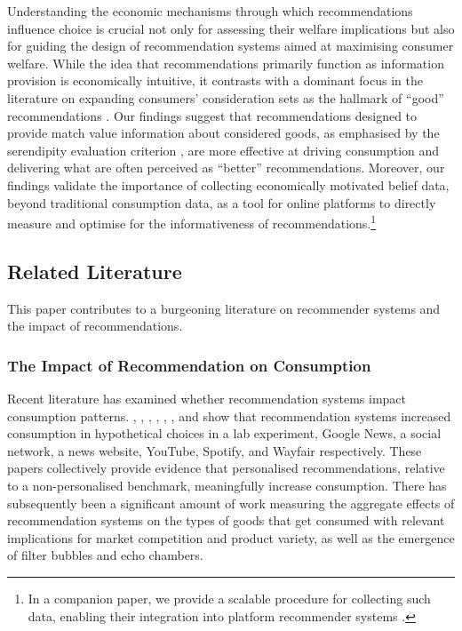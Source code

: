 \documentclass[12pt]{article}
\theoremstyle{newtheorem}
\begin{document}
Understanding the economic mechanisms through which recommendations influence choice is crucial not only for assessing their welfare implications but also for guiding the design of recommendation systems aimed at maximising consumer welfare. 
While the idea that recommendations primarily function as information provision is economically intuitive, it contrasts with a dominant focus in the literature on expanding consumers' consideration sets as the hallmark of ``good'' recommendations \citep{CastellsHurleyVargas2015, KaminskasBridge2016TiiS, Steck2018}. 
Our findings suggest that recommendations designed to provide match value information about considered goods, as emphasised by the serendipity evaluation criterion \citep{KotkovWangVeijalainen2016KBS}, are more effective at driving consumption and delivering what are often perceived as ``better'' recommendations. Moreover, our findings validate the importance of collecting economically motivated belief data, beyond traditional consumption data, as a tool for online platforms to directly measure and optimise for the informativeness of recommendations.\footnote{
    In a companion paper, we provide a scalable procedure for collecting such data, enabling their integration into platform recommender systems \citep{aridor2024movielens}.
}



\subsection{Related Literature}
\label{section:introduction:related-literature}

This paper contributes to a burgeoning literature on recommender systems and the impact of recommendations.


\subsubsection{The Impact of Recommendation on Consumption} Recent literature has examined whether recommendation systems impact consumption patterns.
\citet{SenecalNantel2004}, \citet{DasDatarGargRajaram2007}, \citet{FreyneJacoviGuyGeyer2009}, \citet{ZhouKhemmaratGao2010}, \citet{ClaussenPeukertSen2023MS}, \citet{HoltzCarteretteChandarNazariCramerAral2020WP}, and \citet{DonnellyKanodiaMorozov2024MS}
show that recommendation systems increased consumption in hypothetical choices in a lab experiment, Google News, a social network, a news website, YouTube, Spotify, and Wayfair respectively. 
These papers collectively provide evidence that personalised recommendations, relative to a non-personalised benchmark, meaningfully increase consumption. 
There has subsequently been a significant amount of work measuring the aggregate effects of recommendation systems on the types of goods that get consumed \citep{FlederHosanagar2009MS, NguyenHuiHarperTerveenKonstan2014, BrynjolfssonHuSimester2011MS,HosanagarFlederLeeBuja2013MS, LeeHosanagar2019ISR, HoltzCarteretteChandarNazariCramerAral2020WP, KorganbekovaZuber2023WP} with relevant implications for market competition and product variety, as well as the emergence of filter bubbles and echo chambers.
\end{document}
